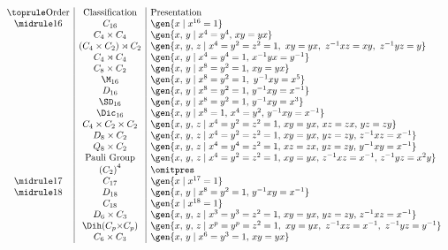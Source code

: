 \begin{displaymath}
\begin{array}{c|c|l}
\toprule
\text{Order} & \text{Classification} & \text{Presentation} \\
\midrule
16 & C_{16} & \gen{x \mid x^{16} = 1} \\
   & C_4 \times C_4 & \gen{x,\,y \mid x^4 = y^4,\, xy = yx} \\
   & (C_4 \times C_2) \rtimes C_2 & \gen{x,\,y,\,z \mid x^4 = y^2 = z^2 = 1,\ xy = yx,\ z^{-1}xz = xy,\ z^{-1}yz = y} \\
   & C_4 \rtimes C_4 & \gen{x,\,y \mid x^4 = y^4 = 1,\, x^{-1}yx = y^{-1}} \\
   & C_8 \times C_2 & \gen{x,\,y \mid x^8 = y^2 = 1,\, xy = yx} \\
   & \M_{16} & \gen{x,\,y \mid x^8 = y^2 = 1,\ y^{-1}xy = x^{5}} \\
   & D_{16} & \gen{x,\,y \mid x^8 = y^2 = 1,\, y^{-1}xy = x^{-1}} \\
   & \SD_{16} & \gen{x,\,y \mid x^8 = y^2 = 1,\, y^{-1}xy = x^3} \\
   & \Dic_{16} & \gen{x,\,y \mid x^8 = 1,\, x^4 = y^2,\, y^{-1}xy = x^{-1}} \\
   & C_4 \times C_2 \times C_2 & \gen{x,\,y,\,z \mid x^4 = y^2 = z^2 = 1,\, xy = yx,\, xz = zx,\, yz = zy} \\
   & D_8 \times C_2 & \gen{x,\,y,\,z \mid x^4 = y^2 = z^2 = 1,\, xy = yx,\, yz = zy,\, z^{-1}xz = x^{-1}} \\
   & Q_8 \times C_2 & \gen{x,\,y,\,z \mid x^4 = y^4 = z^2 = 1,\, xz = zx,\, yz = zy,\, y^{-1}xy = x^{-1}} \\
   & \text{Pauli Group} & \gen{x,\,y,\,z \mid x^4 = y^2 = z^2 = 1,\, xy = yx,\, z^{-1}xz = x^{-1},\, z^{-1}yz = x^2 y}\\
   & {(C_2)}^4 & {\omitpres} \\
\midrule
17 & C_{17} & \gen{x \mid x^{17} = 1} \\
\midrule
18 & D_{18} & \gen{x,\,y \mid x^8 = y^2 = 1,\, y^{-1}xy = x^{-1}} \\
   & C_{18} & \gen{x \mid x^{18} = 1} \\
   & D_6 \times C_3 & \gen{x,\,y,\,z \mid x^3 = y^3 = z^2 = 1,\, xy = yx,\, yz = zy,\, z^{-1}xz = x^{-1}} \\
   & \Dih(C_p {\times} C_p) & \gen{x,\,y,\,z \mid x^p = y^p = z^2 = 1,\ xy = yx,\ z^{-1}xz = x^{-1},\ z^{-1}yz = y^{-1}} \\
   & C_6 \times C_3 & \gen{x,\,y \mid x^6 = y^3 = 1,\, xy = yx} \\

\end{array}
\end{displaymath}
